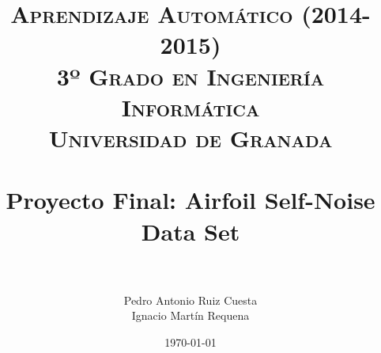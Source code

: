                                                                                                                                                                                                                                                                                                                                                                                                                                                                                                                                                                                                                                                                                                                                                                                                                                                                                                                                                     


\title{	
\normalfont \normalsize 
\textsc{{\bf Aprendizaje Automático (2014-2015)} \\ 3º Grado en Ingeniería Informática \\ Universidad de Granada} \\ [25pt] %
\horrule{0.5pt} \\[0.4cm] %
\huge Proyecto Final: Airfoil Self-Noise Data Set \\ %
\horrule{2pt} \\[0.5cm] %
}

\author{Pedro Antonio Ruiz Cuesta\\Ignacio Martín Requena} %

\date{\normalsize\today} %

\usepackage{graphicx}
\usepackage{listings}
\usepackage[usenames]{color}
\usepackage[urlcolor = blue, hidelinks]{hyperref}

 

